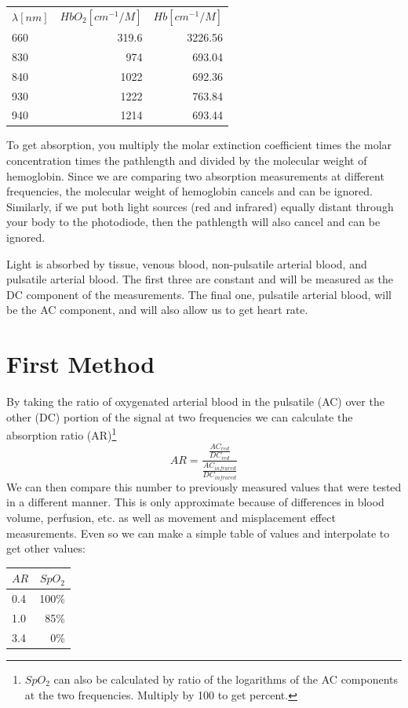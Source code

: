 \begin{tabular}{lrr}
$\lambda[ nm]$  & $HbO_2[ cm^{-1}/M]$ & $Hb[ cm^{-1}/M]$ \\
660              & 319.6                  & 3226.56 \\
830              & 974                    & 693.04 \\
840              & 1022                   & 692.36 \\
930              & 1222                   & 763.84 \\
940              & 1214                   & 693.44 \\
\end{tabular}

To get absorption, you multiply the molar extinction coefficient times the molar concentration times the pathlength and divided by the molecular weight of hemoglobin.  Since we are comparing two absorption measurements at different frequencies, the molecular weight of hemoglobin cancels and can be ignored.  Similarly, if we put both light sources (red and infrared) equally distant through your body to the photodiode, then the pathlength will also cancel and can be ignored.  %

Light is absorbed by tissue, venous blood, non-pulsatile arterial blood, and pulsatile arterial blood.  The first three are constant and will be measured as the DC component of the measurements.  The final one, pulsatile arterial blood, will be the AC component, and will also allow us to get heart rate.

\section{First Method}

By taking the ratio of oxygenated arterial blood in the pulsatile (AC) over the other (DC) portion of the signal at two frequencies we can calculate the absorption ratio (AR)\footnote{$SpO_2$ can also be calculated by ratio of the logarithms of the AC components at the two frequencies.  Multiply by 100 to get percent.}
\begin{equation}
AR = \frac{\frac{AC_{red}}{DC_{red}}}{\frac{AC_{infrared}}{DC_{infrared}}}
\end{equation} 
We can then compare this number to previously measured values that were tested in a different manner.  This is only approximate because of differences in blood volume, perfusion, etc. as well as movement and misplacement effect measurements.  Even so we can make a simple table of values and interpolate to get other values:

\begin{tabular}{lr} 
$AR$ & $SpO_2$ \\\hline
0.4  & 100\% \\
1.0  & 85\% \\
3.4  & 0\% \\
\end{tabular}

